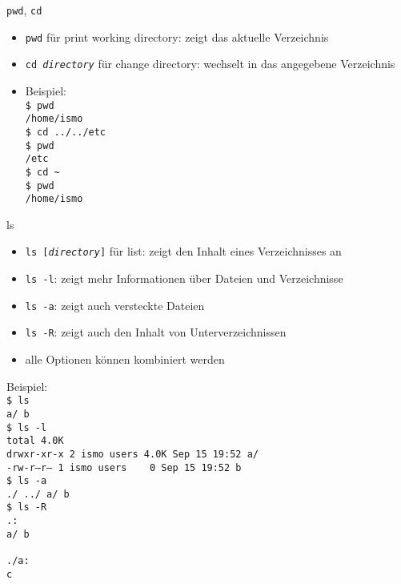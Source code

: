     \begin{frame}{\texttt{pwd}, \texttt{cd}}
      \begin{itemize}
        \item \texttt{pwd} für print working directory: zeigt das aktuelle Verzeichnis
        \item \texttt{cd \textit{directory}} für change directory: wechselt in das angegebene Verzeichnis
        \item Beispiel:\\
          \texttt{\$ pwd\\
                  /home/ismo\\
                  \$ cd ../../etc\\
                  \$ pwd\\
                  /etc\\
                  \$ cd \textasciitilde\\
                  \$ pwd\\
                  /home/ismo}
      \end{itemize}
    \end{frame}

    \begin{frame}{ls}
      \begin{itemize}
        \item \texttt{ls [\textit{directory}]} für list: zeigt den Inhalt eines Verzeichnisses an
        \item \texttt{ls -l}: zeigt mehr Informationen über Dateien und Verzeichnisse
        \item \texttt{ls -a}: zeigt auch versteckte Dateien
        \item \texttt{ls -R}: zeigt auch den Inhalt von Unterverzeichnissen
        \item alle Optionen können kombiniert werden
      \end{itemize}
    \end{frame}

    \begin{frame}
      Beispiel:\\
      \texttt{\$ ls\\
              a/  b\\
              \$ ls -l\\
              total 4.0K\\
              drwxr-xr-x 2 ismo users 4.0K Sep 15 19:52 a/\\
              -rw-r--r-- 1 ismo users \ \ \ 0 Sep 15 19:52 b\\
              \$ ls -a\\
              ./  ../  a/  b\\
              \$ ls -R\\
              .:\\
              a/  b\\
              ~\\
              ./a:\\
              c}
    \end{frame}

